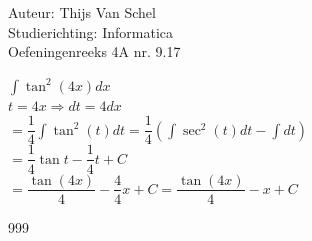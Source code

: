\documentclass[a4paper]{article}
\newcommand{\dint}{\displaystyle\int}
\begin{document}
  
\noindent \large Auteur: Thijs Van Schel \\
\noindent \large Studierichting: Informatica\\
\noindent \large Oefeningenreeks 4A nr. 9.17\\

\medskip

\normalsize

$\dint\tan^2(4x)dx$\\

$t=4x \Rightarrow dt = 4dx$\\

$= \dfrac{1}{4}\dint\tan^2(t)dt = \dfrac{1}{4}\left(\dint\sec^2(t)dt - \dint dt \right)$\\

$= \dfrac{1}{4}\tan t - \dfrac{1}{4}t + C$\\

$= \dfrac{\tan(4x)}{4} - \dfrac{4}{4}x + C = \dfrac{\tan(4x)}{4} - x + C$

\begin{thebibliography}{999}
\end{thebibliography}
\end{document}
